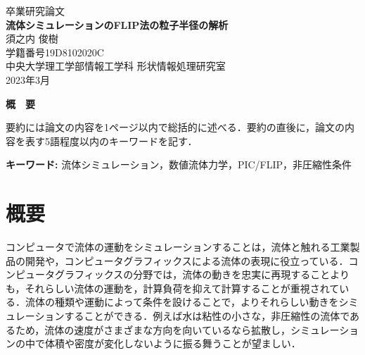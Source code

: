 \documentclass[a4j,12pt]{jreport}
\begin{document}
\thispagestyle{empty}
\begin{center}
\begin{Large}
\vspace*{0.7cm}
{\large 卒業研究論文}\\
\vspace*{2.5cm}
{\bf 流体シミュレーションのFLIP法の粒子半径の解析}\\
\vspace*{7.5cm}
須之内 俊樹\\
学籍番号\hspace*{1zw}19D8102020C\\
\vspace*{2.5cm}
中央大学理工学部情報工学科\hspace*{1zw} 形状情報処理研究室\\
\vspace*{3.0cm}
2023年3月\\
\end{Large}
\end{center}


\newpage
\renewcommand{\baselinestretch}{1.25} \selectfont
{}


\begin{center} {\large \bf{概　要}} \end{center}

要約には論文の内容を1ページ以内で総括的に述べる．要約の直後に，論文の内容を表す5語程度以内のキーワードを記す．


\vspace{1zw} \noindent
{\bf キーワード: }流体シミュレーション，数値流体力学，PIC/FLIP，非圧縮性条件

\tableofcontents


\newpage
{}

\chapter{概要} \label{chapter:1}
コンピュータで流体の運動をシミュレーションすることは，流体と触れる工業製品の開発や，コンピュータグラフィックスによる流体の表現に役立っている．コンピュータグラフィックスの分野では，流体の動きを忠実に再現することよりも，それらしい流体の運動を，計算負荷を抑えて計算することが重視されている．流体の種類や運動によって条件を設けることで，よりそれらしい動きをシミュレーションすることができる．例えば水は粘性の小さな，非圧縮性の流体であるため，流体の速度がさまざまな方向を向いているなら拡散し，シミュレーションの中で体積や密度が変化しないように振る舞うことが望ましい．
\end{document}
